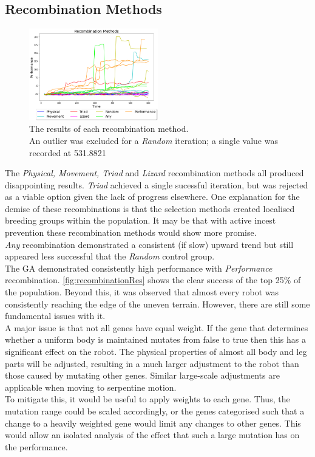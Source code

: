 \documentclass{article}
\begin{document}
\subsection{Recombination Methods}
\label{sec:Recombination Res}
\begin{figure}
    \centering
    \vspace*{-5mm}
    \includegraphics[width=0.5\textwidth]{recombinationTypes}
    \vspace*{-7mm}
    \caption{The results of each recombination method.\\ An outlier was excluded for a \textit{Random} iteration; a single value was recorded at 531.8821}
    \label{fig:recombinationRes}
\end{figure}
The \textit{Physical, Movement, Triad} and \textit{Lizard} recombination methods all produced disappointing results. \textit{Triad} achieved a single sucessful iteration, but was rejected as a viable option given the lack of progress elsewhere. One explanation for the demise of these recombinations is that the selection methods created localised breeding groups within the population. It may be that with active incest prevention  these recombination methods would show more promise.\\
\textit{Any} recombination demonstrated a consistent (if slow) upward trend but still appeared less successful that the \textit{Random} control group.\\
The GA demonstrated consistently high performance with \textit{Performance} recombination. \autoref{fig:recombinationRes} shows the clear success of the top 25\% of the population. Beyond this, it was observed that almost every robot was consistently reaching the edge of the uneven terrain. However, there are still some fundamental issues with it.\\
A major issue is that not all genes have equal weight. If the gene that determines whether a uniform body is maintained mutates from false to true then this has a significant effect on the robot. The physical properties of almost all body and leg parts will be adjusted, resulting in a much larger adjustment to the robot than those caused by mutating other genes. Similar large-scale adjustments are applicable when moving to serpentine motion.\\
To mitigate this, it would be useful to apply weights to each gene. Thus, the mutation range could be scaled accordingly, or the genes categorised such that a change to a heavily weighted gene would limit any changes to other genes. This would allow an isolated analysis of the effect that such a large mutation has on the performance.\\
\end{document}
